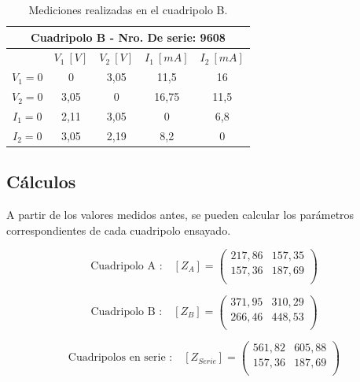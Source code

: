 \documentclass[a4paper]{article}
\begin{document}
\begin{table}[H]
\begin{center}
\begin{tabular}{|c|c|c|c|c|}
\hline
\multicolumn{5}{|c|}{Cuadripolo B - Nro. De serie: 9608} \\ \hline
 & $V_1 \ [V]$ & $V_2 \ [V]$ & $I_1 \ [mA]$ & $I_2 \ [mA]$ \\ \hline
$V_1 = 0$ & 0 & 3,05 & 11,5 & 16 \\ \hline
$V_2 = 0$ & 3,05 & 0 & 16,75 & 11,5 \\ \hline
$I_1 = 0$ & 2,11 & 3,05 & 0 & 6,8 \\ \hline
$I_2 = 0$ & 3,05 & 2,19 & 8,2 & 0 \\ \hline
\end{tabular}
\caption{Mediciones realizadas en el cuadripolo B.}
\end{center}
\end{table}

\subsection*{Cálculos}

A partir de los valores medidos antes, se pueden calcular los parámetros correspondientes de cada cuadripolo ensayado.

\begin{equation}
\text{Cuadripolo A :}\quad [Z_{A}] =
\left( \begin{array}{cc}
	217,86 & 157,35\\
	157,36 & 187,69\\
\end{array} \right)
\end{equation}

\begin{equation}
\text{Cuadripolo B :}\quad [Z_{B}] =
\left( \begin{array}{cc}
	371,95 & 310,29\\
	266,46 & 448,53\\
\end{array} \right)
\end{equation}

\begin{equation}
\text{Cuadripolos en serie :}\quad [Z_{Serie}] =
\left( \begin{array}{cc}
	561,82 & 605,88\\
	157,36 & 187,69\\
\end{array} \right)
\end{equation}
\end{document}
